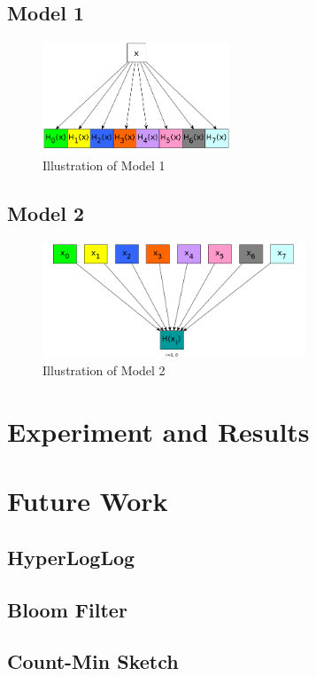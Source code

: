 \documentclass[11pt,oneside,a4paper]{article}
\begin{document}
\subsection{Model 1}
\begin{figure}[H]
\centering
\includegraphics[width=0.5\textwidth]{one_data_multi_hash.png} 
\caption{Illustration of Model 1}
\end{figure}
\subsection{Model 2}
\begin{figure}[H]
\centering
\includegraphics[width=0.7\textwidth]{multi_data_single_hash.png} 
\caption{Illustration of Model 2}
\end{figure}

\section{Experiment and Results}
\section{Future Work}
\subsection{HyperLogLog}
\subsection{Bloom Filter}
\subsection{Count-Min Sketch}
\end{document}
